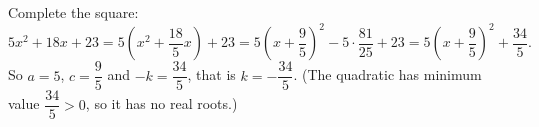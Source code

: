 Complete the square:
\[
5x^2+18x+23=5\left(x^2+\dfrac{18}{5}x\right)+23=5\left(x+\dfrac{9}{5}\right)^2-5\cdot\dfrac{81}{25}+23=5\left(x+\dfrac{9}{5}\right)^2+\dfrac{34}{5}.
\]
So $a=5$, $c=\dfrac{9}{5}$ and $-k=\dfrac{34}{5}$, that is $k=\boxed{-\dfrac{34}{5}}$. (The quadratic has minimum value $\dfrac{34}{5}>0$, so it has no real roots.)
